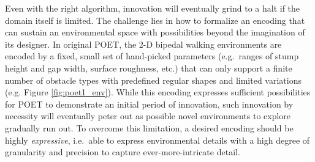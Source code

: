 \documentclass{article}
\newcommand{\removed}[1]{\comments{\textcolor{gray}{\sout{#1}}}}
\newcommand{\comments}[1]{#1} %
\begin{document}
Even with the right algorithm, innovation will eventually grind to a halt if the domain itself is limited. The challenge lies in how to formalize an encoding that can sustain an environmental space with possibilities beyond the imagination of its designer. 
In original POET, the 2-D bipedal walking environments are encoded by a fixed, small set of hand-picked parameters (e.g.\ ranges of stump height and gap width, surface roughness, etc.) that can only support a finite number of obstacle types with predefined regular shapes and limited variations (e.g. Figure \ref{fig:poet1_env}). While this encoding expresses sufficient possibilities for POET to demonstrate an initial period of innovation, such innovation by necessity will eventually peter out as possible novel environments to explore gradually run out. 
To overcome this limitation,
a desired encoding should be highly \emph{expressive}, i.e.\ able to express environmental details with a high degree of granularity and precision to capture ever-more-intricate detail. 
\end{document}
